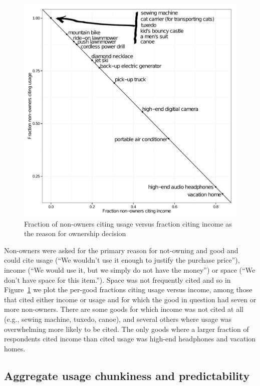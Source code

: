 \documentclass[11pt]{article}
\begin{document}
\begin{figure}
\centering 
\caption{Fraction of non-owners citing usage versus fraction citing income as the reason for ownership decision} 
\label{fig:reasons}
\begin{minipage}{0.60 \linewidth}
\includegraphics[width = \linewidth]{./plots/reasons_for_nonownership.pdf} 
\end{minipage} 
\end{figure} 

Non-owners were asked for the primary reason for not-owning and good and could cite usage (``We wouldn't use it enough to justify the purchase price''), income  (``We would use it, but we simply do not have the money'') or space (``We don't have space for this item.'').
Space was not frequently cited and so in Figure~\ref{fig:reasons} we plot the per-good fractions citing usage versus income, among those that cited either income or usage and for which the good in question had seven or more non-owners. 
There are some goods for which income was not cited at all (e.g., sewing machine, tuxedo, canoe), and several others where usage was overwhelming more likely to be cited.
The only goods where a larger fraction of respondents cited income than cited usage was high-end headphones and vacation homes. 

\subsection{Aggregate usage chunkiness and predictability} 
\end{document}
